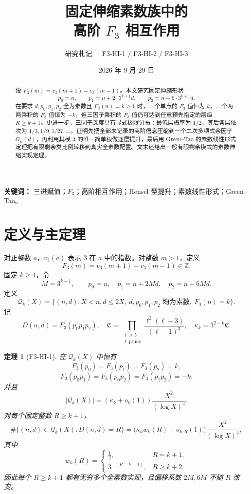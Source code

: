 \documentclass[11pt,a4paper]{ctexart}
\title{\bfseries 固定伸缩素数族中的\\高阶 $F_3$ 相互作用}
\author{研究札记 · F3-HI-1 / F3-HI-2 / F3-HI-3}
\date{2026 年 9 月 29 日}
\newtheorem{theorem}{定理}
\newcommand{\vthree}{v_3}
\newcommand{\Fthree}{F_3}
\newcommand{\Qk}{\mathcal Q_k}
\newcommand{\Cfrak}{\mathfrak C}
\begin{document}
\maketitle

\begin{abstract}
设 $\Fthree(m)=\vthree(m+1)-\vthree(m-1)$。本文研究固定伸缩形状
\[
 p_0=n,\qquad p_1=n+2\cdot 3^{k+1}d,\qquad p_2=n+6\cdot 3^{k+1}d.
\]
在要求 $d,p_0,p_1,p_2$ 全为素数且 $\Fthree(n)=k\ge1$ 时，三个单点的 $F_3$ 值恒为 $k$，三个两两乘积的 $F_3$ 值恒为 $-k$，但三因子乘积的 $F_3$ 值仍可达到任意预先指定的层级 $R\ge k+1$。更进一步，三因子深度具有显式极限分布：最低层概率为 $1/2$，其后各层依次为 $1/3,1/9,1/27,\ldots$。证明先把全部未记录的高阶信息压缩到一个二次多项式余因子 $G_n(d)$，再利用其模 $3$ 的唯一简单根做逐层提升，最后用 Green--Tao 的素数线性形式定理把有限剩余类比例转移到真实全素数配置。文末还给出一般有限剩余模式的素数伸缩实现定理。
\end{abstract}

\noindent\textbf{关键词：} 三进赋值；$F_3$；高阶相互作用；Hensel 型提升；素数线性形式；Green--Tao。

\section{定义与主定理}
对正整数 $a$，$\vthree(a)$ 表示 $3$ 在 $a$ 中的指数。对整数 $m>1$，定义
\[
\Fthree(m)=\vthree(m+1)-\vthree(m-1)\in\mathbb Z.
\]
固定 $k\ge1$，令
\[
M=3^{k+1},\qquad p_0=n,\quad p_1=n+2Md,\quad p_2=n+6Md.
\]
定义
\[
\Qk(X)=\{(n,d):X<n,d\le2X,\ d,p_0,p_1,p_2\text{ 均为素数},\ \Fthree(n)=k\}.
\]
记
\[
D(n,d)=\Fthree(p_0p_1p_2),
\quad
\Cfrak=\prod_{\substack{\ell\ge5\\ \ell\ \mathrm{prime}}}
\frac{\ell^2(\ell-3)}{(\ell-1)^3},
\quad
\kappa_k=3^{2-k}\Cfrak.
\]

\begin{theorem}[F3-HI-1]
在 $\Qk(X)$ 中恒有
\[
\Fthree(p_0)=\Fthree(p_1)=\Fthree(p_2)=k,
\]
\[
\Fthree(p_0p_1)=\Fthree(p_0p_2)=\Fthree(p_1p_2)=-k.
\]
并且
\[
|\Qk(X)|=(\kappa_k+o_k(1))\frac{X^2}{(\log X)^4}.
\]
对每个固定整数 $R\ge k+1$，
\[
\#\{(n,d)\in\Qk(X):D(n,d)=R\}
=\bigl(\kappa_k w_k(R)+o_{k,R}(1)\bigr)\frac{X^2}{(\log X)^4},
\]
其中
\[
w_k(R)=
\begin{cases}
\frac12,&R=k+1,\\[2mm]
3^{-(R-k-1)},&R\ge k+2.
\end{cases}
\]
因此每个 $R\ge k+1$ 都有无穷多个全素数实现，且偏移系数 $2M,6M$ 不随 $R$ 改变。
\end{theorem}
\end{document}
